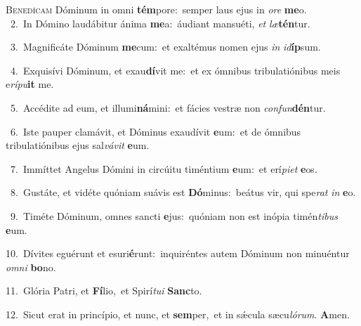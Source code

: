 \lettrine{\initial\textcolor{\initialcolor}{B}}{enedícam} Dóminum in omni \textbf{tém}\-pore:~\star semper laus ejus in \textit{o}\-\textit{re} \textbf{me}\-o.\\
{\numbfont\textcolor{\numbcolor}{~2.}}~In Dómino laudábitur ánima \textbf{me}\-a:~\star áudiant mansuéti, \textit{et} \textit{læ}\-\textbf{tén}tur.\par
{\numbfont\textcolor{\numbcolor}{~3.}}~Magnificáte Dóminum \textbf{me}\-cum:~\star et exaltémus nomen ejus \textit{in} \textit{id}\-\textbf{íp}sum.\par
{\numbfont\textcolor{\numbcolor}{~4.}}~Exquisívi Dóminum, et exau\-\textbf{dí}\-vit me:~\star et ex ómnibus tribulatiónibus meis e\-\textit{rí}\-\textit{pu}\textbf{it} me.\par
{\numbfont\textcolor{\numbcolor}{~5.}}~Accédite ad eum, et illumi\-\textbf{ná}\-mini:~\star et fácies vestræ non \textit{con}\-\textit{fun}\textbf{dén}tur.\par
{\numbfont\textcolor{\numbcolor}{~6.}}~Iste pauper clamávit, et Dóminus exaudívit \textbf{e}\-um:~\star et de ómnibus tribulatiónibus ejus sal\-\textit{vá}\-\textit{vit} \textbf{e}\-um.\par
{\numbfont\textcolor{\numbcolor}{~7.}}~Immíttet Angelus Dómini in circúitu timéntium \textbf{e}\-um:~\star et erí\-\textit{pi}\-\textit{et} \textbf{e}\-os.\par
{\numbfont\textcolor{\numbcolor}{~8.}}~Gustáte, et vidéte quóniam suávis est \textbf{Dó}\-minus:~\star beátus vir, qui spe\textit{rat} \textit{in} \textbf{e}\-o.\par
{\numbfont\textcolor{\numbcolor}{~9.}}~Timéte Dóminum, omnes sancti \textbf{e}\-jus:~\star quóniam non est inópia timén\-\textit{ti}\-\textit{bus} \textbf{e}\-um.\par
{\numbfont\textcolor{\numbcolor}{10.}}~Dívites eguérunt et esuri\-\textbf{é}\-runt:~\star inquiréntes autem Dóminum non minuéntur \textit{om}\-\textit{ni} \textbf{bo}\-no.\par
{\numbfont\textcolor{\numbcolor}{11.}}~Glória Patri, et \textbf{Fí}\-lio,~\star et Spirí\-\textit{tu}\-\textit{i} \textbf{Sanc}\-to.\par
{\numbfont\textcolor{\numbcolor}{12.}}~Sicut erat in princípio, et nunc, et \textbf{sem}\-per,~\star et in sǽcula sæcu\-\textit{ló}\-\textit{rum}. \textbf{A}\-men.\par
